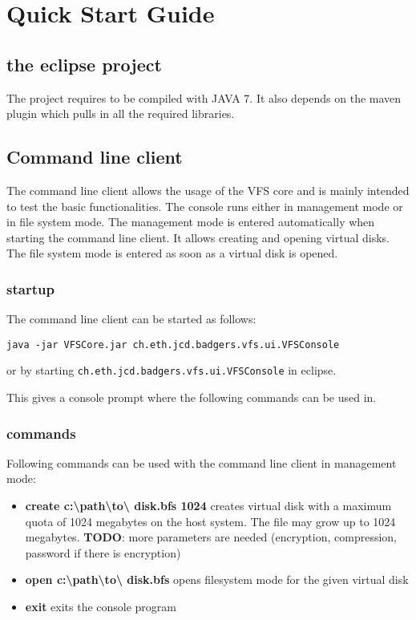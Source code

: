 

\section{Quick Start Guide}


\subsection{the eclipse project}
The project requires to be compiled with JAVA 7. It also depends on the maven
plugin which pulls in all the required libraries.

\subsection{Command line client}

The command line client allows the usage of the VFS core and is mainly intended
to test the basic functionalities. The console runs either in  management mode
or in file system mode. The management mode is entered automatically when
starting the command line client. It allows creating and opening virtual
disks. The file system mode is entered as soon as a virtual disk is opened.


\subsubsection{startup}
The command line client can be started as follows:

\begin{verbatim}
java -jar VFSCore.jar ch.eth.jcd.badgers.vfs.ui.VFSConsole
\end{verbatim}

or by starting \verb|ch.eth.jcd.badgers.vfs.ui.VFSConsole| in eclipse.



This gives a console prompt where the following commands can be used in.

\subsubsection{commands}
Following commands can be used with the command line client in management mode:

\begin{itemize}
  \item{\textbf{create c:\textbackslash path\textbackslash to\textbackslash
  disk.bfs 1024}} creates virtual disk with a maximum quota of 1024 megabytes on the host system. The file may grow up to 1024 megabytes.
  \textbf{TODO}: more parameters are needed (encryption, compression, password if there is encryption)
  \item {\textbf{open c:\textbackslash path\textbackslash to\textbackslash
  disk.bfs}} opens filesystem mode for the given virtual disk
  \item {\textbf{exit}} exits the console program
\end{itemize}

